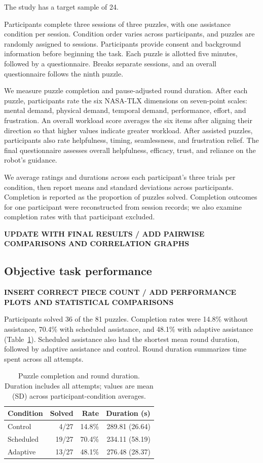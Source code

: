 \documentclass[sigconf]{aamas}
\begin{document}
The study has a target sample of 24.

Participants complete three sessions of three puzzles, with one assistance condition per session. Condition order varies across participants, and puzzles are randomly assigned to sessions. Participants provide consent and background information before beginning the task. Each puzzle is allotted five minutes, followed by a questionnaire. Breaks separate sessions, and an overall questionnaire follows the ninth puzzle.

We measure puzzle completion and pause-adjusted round duration. After each puzzle, participants rate the six NASA-TLX dimensions on seven-point scales: mental demand, physical demand, temporal demand, performance, effort, and frustration. An overall workload score averages the six items after aligning their direction so that higher values indicate greater workload. After assisted puzzles, participants also rate helpfulness, timing, seamlessness, and frustration relief. The final questionnaire assesses overall helpfulness, efficacy, trust, and reliance on the robot's guidance.

We average ratings and durations across each participant's three trials per condition, then report means and standard deviations across participants. Completion is reported as the proportion of puzzles solved. Completion outcomes for one participant were reconstructed from session records; we also examine completion rates with that participant excluded.

\textbf{UPDATE WITH FINAL RESULTS / ADD PAIRWISE COMPARISONS AND CORRELATION GRAPHS}

\subsection{Objective task performance}

\textbf{INSERT CORRECT PIECE COUNT / ADD PERFORMANCE PLOTS AND STATISTICAL COMPARISONS}

Participants solved 36 of the 81 puzzles. Completion rates were 14.8\% without assistance, 70.4\% with scheduled assistance, and 48.1\% with adaptive assistance (Table~\ref{tab:performance}). Scheduled assistance also had the shortest mean round duration, followed by adaptive assistance and control. Round duration summarizes time spent across all attempts.

\begin{table}[t]
\centering
\caption{Puzzle completion and round duration. Duration includes all attempts; values are mean (SD) across participant-condition averages.}
\label{tab:performance}
\begin{tabular}{lrrr}
\toprule
Condition & Solved & Rate & Duration (s) \\
\midrule
Control & 4/27 & 14.8\% & 289.81 (26.64) \\
Scheduled & 19/27 & 70.4\% & 234.11 (58.19) \\
Adaptive & 13/27 & 48.1\% & 276.48 (28.37) \\
\bottomrule
\end{tabular}
\end{table}
\end{document}
